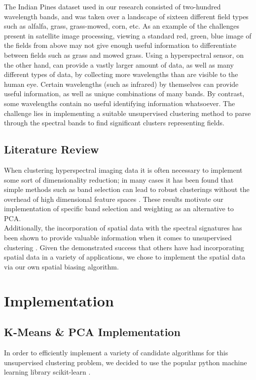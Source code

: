 \documentclass[journal]{IEEEtran}
\begin{document}
The Indian Pines \cite{IndianPines} dataset used in our research consisted of two-hundred wavelength bands, and was taken over a landscape of sixteen different field types such as alfalfa, grass, grass-mowed, corn, etc. As an example of the challenges present in satellite image processing, viewing a standard red, green, blue image of the fields from above may not give enough useful information to differentiate between fields such as grass and mowed grass. Using a hyperspectral sensor, on the other hand, can provide a vastly larger amount of data, as well as many different types of data, by collecting more wavelengths than are visible to the human eye. Certain wavelengths (such as infrared) by themselves can provide useful information, as well as unique combinations of many bands. By contrast, some wavelengths contain no useful identifying information whatsoever. The challenge lies in implementing a suitable unsupervised clustering method to parse through the spectral bands to find significant clusters representing fields.\\



\subsection{Literature Review}
When clustering hyperspectral imaging data it is often necessary to implement some sort of dimensionality reduction; in many cases it has been found that simple methods such as band selection can lead to robust clusterings without the overhead of high dimensional feature spaces \cite{PCADimensionReduction}. These results motivate our implementation of specific band selection and weighting as an alternative to PCA.\\

Additionally, the incorporation of spatial data with the spectral signatures has been shown to provide valuable information when it comes to unsupervised clustering \cite{SpectralSpatial}. Given the demonstrated success that others have had incorporating spatial data in a variety of applications, we chose to implement the spatial data via our own spatial biasing algorithm.\\

\section{Implementation}
  \subsection{K-Means \& PCA Implementation}
    In order to efficiently implement a variety of candidate algorithms for this unsupervised clustering problem, we decided to use the popular python machine learning library scikit-learn \cite{ScikitLearnAPI}.\\
\end{document}
